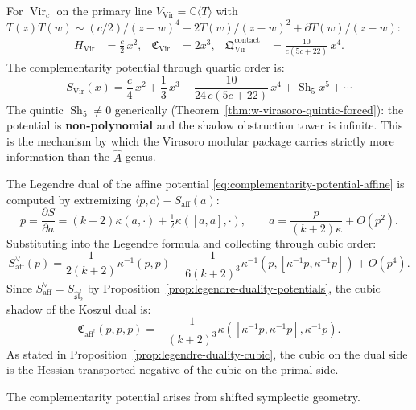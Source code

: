 \begin{example}
\label{ex:complementarity-potential-virasoro}
For $\operatorname{Vir}_c$ on the primary line
$V_{\mathrm{Vir}} = \mathbb{C}\langle T\rangle$ with
$T(z)T(w) \sim (c/2)/(z{-}w)^4 + 2T(w)/(z{-}w)^2 + \partial
T(w)/(z{-}w)$:
\begin{align}
H_{\mathrm{Vir}} &= \tfrac{c}{2}\,x^2,
&
\mathfrak{C}_{\mathrm{Vir}} &= 2x^3,
&
\mathfrak{Q}^{\mathrm{contact}}_{\mathrm{Vir}}
&= \frac{10}{c(5c{+}22)}\,x^4.
\end{align}
The complementarity potential through quartic order is:
\begin{equation}
\label{eq:complementarity-potential-virasoro}
S_{\mathrm{Vir}}(x)
= \frac{c}{4}\,x^2
+ \frac{1}{3}\,x^3
+ \frac{10}{24\,c(5c{+}22)}\,x^4
+ \operatorname{Sh}_5 x^5 + \cdots
\end{equation}
The quintic $\operatorname{Sh}_5 \neq 0$ generically
(Theorem~\ref{thm:w-virasoro-quintic-forced}): the potential is
\textbf{non-polynomial} and the shadow obstruction tower is infinite. This
is the mechanism by which the Virasoro modular package carries
strictly more information than the $\hat{A}$-genus.
\end{example}

\begin{example}
\label{ex:legendre-duality-affine}
The Legendre dual of the affine potential
\eqref{eq:complementarity-potential-affine} is computed by
extremizing $\langle p, a\rangle - S_{\mathrm{aff}}(a)$:
\[
p = \frac{\partial S}{\partial a}
= (k{+}2)\kappa(a,\cdot) + \tfrac12\kappa([a,a],\cdot),
\qquad
a = \frac{p}{(k{+}2)\kappa} + O(p^2).
\]
Substituting into the Legendre formula and collecting through
cubic order:
\[
S_{\mathrm{aff}}^\vee(p)
= \frac{1}{2(k{+}2)}\kappa^{-1}(p,p)
- \frac{1}{6(k{+}2)^3}\kappa^{-1}(p,[\kappa^{-1}p,\kappa^{-1}p])
+ O(p^4).
\]
Since $S_{\mathrm{aff}}^\vee = S_{\widehat{\mathfrak{sl}}_2^!}$
by Proposition~\ref{prop:legendre-duality-potentials}, the cubic
shadow of the Koszul dual is:
\[
\mathfrak{C}_{\mathrm{aff}^!}(p,p,p)
= -\frac{1}{(k{+}2)^3}\kappa([\kappa^{-1}p,\kappa^{-1}p],
\kappa^{-1}p).
\]
As stated in Proposition~\ref{prop:legendre-duality-cubic}, the
cubic on the dual side is the Hessian-transported negative of the
cubic on the primal side.
\end{example}

The complementarity potential arises from shifted
symplectic geometry.

